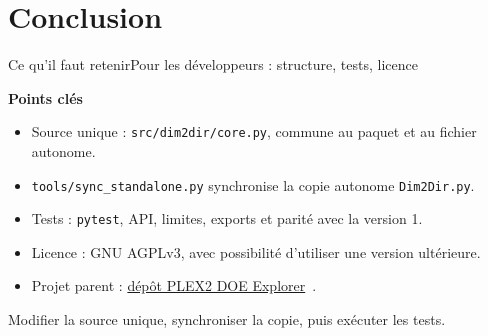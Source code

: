 ﻿\setcounter{chapCompteur}{5}
\section{Conclusion}

\begin{frame}[t]{Ce qu'il faut retenir}{Pour les développeurs : structure, tests, licence}
\vfill
{
\begin{mybox3}{\textbf{Points clés}}
\begin{itemize}\itemsep5pt
\item Source unique : \texttt{src/dim2dir/core.py}, commune au paquet et au fichier autonome.
\item \texttt{tools/sync\_standalone.py} synchronise la copie autonome \texttt{Dim2Dir.py}.
\item Tests : \texttt{pytest}, API, limites, exports et parité avec la version 1.
\item Licence : GNU AGPLv3, avec possibilité d'utiliser une version ultérieure.
\item Projet parent : \href{https://github.com/Philippe-AMUZUGA/plex2-doe-explorer}{dépôt PLEX2 DOE Explorer}~\cite{plex2}.
\end{itemize}
\end{mybox3}
Modifier la source unique, synchroniser la copie, puis exécuter les tests.}
\vfill
\end{frame}
